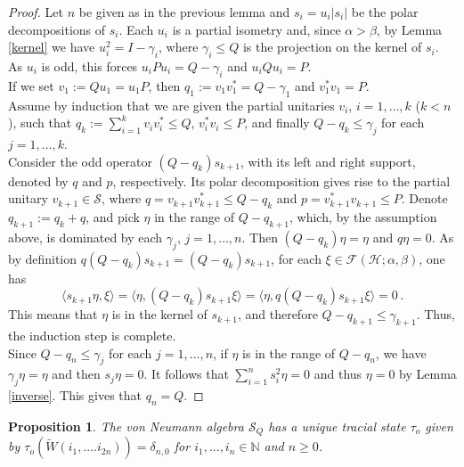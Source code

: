 \documentclass[12pt]{amsart}
\numberwithin{equation}{section}
\def\cf{{\mathcal F}}
\def\ch{{\mathcal H}}
\def\bn{{\mathbb N}}
\def\a{\alpha}
\def\b{\beta}
\def\g{\gamma}  \def\G{\Gamma}
\newtheorem{prop}[thm]{Proposition}
\theoremstyle{definition}
\begin{document}
\begin{proof}
  Let $n$ be given as in the previous lemma and $s_i=u_i|s_i|$ be the
  polar decompositions of $s_i$. Each $u_i$ is a partial isometry  and, since $\a>\b$, by
  Lemma \ref{kernel} we have $u_i^2=I-\gamma_i$, where $\gamma_i\leq Q$ is the projection on the kernel of $s_i$. As $u_i$ is odd, this forces $u_iPu_i=Q-\gamma_i$ and $u_iQu_i=P$.\\
If we set $v_1:=Qu_1=u_1P$, then $q_1:=v_1v_1^*=Q-\g_1$ and $v_1^*v_1=P$.\\
Assume by induction that we are given the partial unitaries $v_i$, $i=1,\ldots,k$ ($k<n$), such that
  $q_k:=\sum_{i=1}^{k} v_iv_i^*\leq Q$, $v_i^*v_i\leq P$, and finally $Q-q_k\leq \g_j$ for each $j=1,\ldots, k$.\\
  Consider the odd operator $(Q-q_k)s_{k+1}$, with its
  left and right support, denoted by $q$ and $p$, respectively. Its polar decomposition gives rise to the partial unitary $v_{k+1}\in \mathcal S$, where
   $q=v_{k+1}v_{k+1}^*\leq Q-q_k$ and $p=v_{k+1}^*v_{k+1}\leq P$. Denote $q_{k+1}:=q_k+q$, and pick $\eta$ in the range of $Q-q_{k+1}$, which, by the assumption above, is dominated by each $\gamma_j$, $j=1,\ldots,n$. Then $(Q-q_k)\eta=\eta$ and $q \eta=0$. As by definition $q(Q-q_k)s_{k+1}=(Q-q_k)s_{k+1}$, for each $\xi\in\cf(\ch;\a,\b)$, one has
   $$
   \langle s_{k+1}\eta, \xi\rangle= \langle \eta, (Q-q_k)s_{k+1}\xi\rangle=\langle \eta, q(Q-q_k)s_{k+1}\xi\rangle=0\,.
   $$
   This means that $\eta$ is in the kernel of $s_{k+1}$, and therefore $Q-q_{k+1}\leq \g_{k+1}$. Thus, the induction step is complete.\\
Since $Q-q_n\leq \g_j$ for each $j=1,\ldots,n$, if   $\eta$ is in the range of $Q-q_{n}$, we have $\g_j\eta=\eta$ and then $s_j \eta=0$. It follows that $\sum_{i=1}^n s_i^2 \eta=0$ and thus $\eta=0$ by Lemma \ref{inverse}. This gives that $q_n=Q$.
\end{proof}
\begin{prop}\label{sqfact}
  The von Neumann algebra $\mathcal{S}_Q$ has a unique tracial state
  $\tau_o$ given by $\tau_o(\widetilde W(i_1,....i_{2n}))=\delta_{n,0}$ for $i_1,...,i_n\in \bn$ and $n\geq 0$.
\end{prop}
\end{document}
